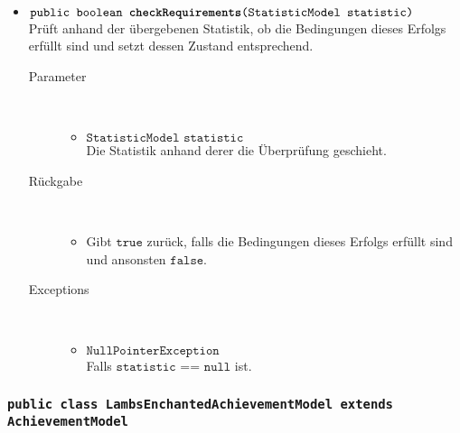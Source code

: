 \begin{description}
\begin{itemize}
		\item $\texttt{public boolean \textbf{checkRequirements}(StatisticModel statistic)}$ \\ Prüft anhand der übergebenen Statistik, ob die Bedingungen dieses Erfolgs erfüllt sind und setzt dessen Zustand entsprechend.
		\begin{description}
		\item[Parameter] \hfill \\
			\vspace{-.8cm}
			\begin{itemize}
				\item $\texttt{StatisticModel statistic}$ \\ Die Statistik anhand derer die Überprüfung geschieht. 
			\end{itemize}
			\item[Rückgabe] \hfill \\
			\vspace{-.8cm}
			\begin{itemize}
				\item Gibt $\texttt{true}$ zurück, falls die Bedingungen dieses Erfolgs erfüllt sind und ansonsten $\texttt{false}$.
			\end{itemize}
			\item[Exceptions] \hfill \\
			\vspace{-.8cm}
			\begin{itemize}
				\item $\texttt{NullPointerException}$ \\ Falls $\texttt{statistic == null}$ ist.
			\end{itemize}
		\end{description}
		
	\end{itemize}
\end{description}

\subsubsection{\normalfont \texttt{public class \textbf{LambsEnchantedAchievementModel} extends AchievementModel}}

